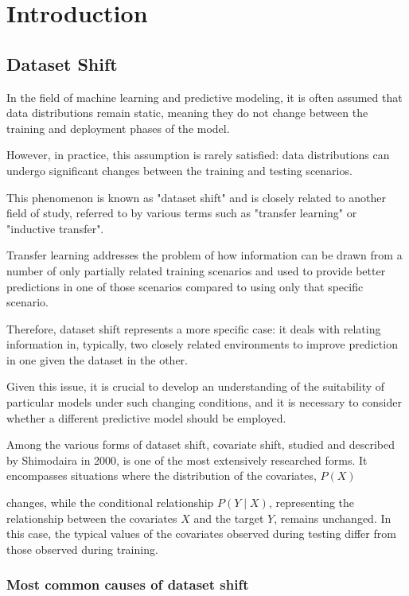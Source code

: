 \chapter{Introduction}


\section{Dataset Shift}

In the field of machine learning and predictive modeling, it is often assumed that data distributions remain static, meaning they do not change between the training and deployment phases of the model.

However, in practice, this assumption is rarely satisfied: data distributions can undergo significant changes between the training and testing scenarios.

This phenomenon is known as "dataset shift" and is closely related to another field of study, referred to by various terms such as "transfer learning" or "inductive transfer".

Transfer learning addresses the problem of how information can be drawn from a number of only partially related training scenarios and used to provide better predictions in one of those scenarios compared to using only that specific scenario.

Therefore, dataset shift represents a more specific case: it deals with relating information in, typically, two closely related environments to improve prediction in one given the dataset in the other.

Given this issue, it is crucial to develop an understanding of the suitability of particular models under such changing conditions, and it is necessary to consider whether a different predictive model should be employed.

Among the various forms of dataset shift, covariate shift, studied and described by Shimodaira in 2000, is one of the most extensively researched forms. It encompasses situations where the distribution of the covariates, $𝑃(X)$

changes, while the conditional relationship $P(Y \mid X)$, representing the relationship between the covariates $X$ and the target $Y$, remains unchanged. In this case, the typical values of the covariates observed during testing differ from those observed during training.



\subsection{Most common causes of dataset shift}
	
